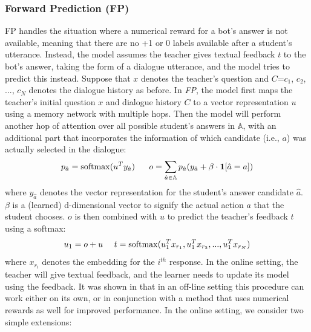 \subsubsection{Forward Prediction (FP)}
FP \citep{weston2016dialog} handles the situation where a numerical reward for a bot's answer is not available, meaning that there are no +1 or 0 labels available after a student's utterance.
Instead, the model assumes
 the teacher gives  textual feedback $t$ to the bot's answer, taking the form of a dialogue utterance,
and the model tries to predict this instead.
Suppose that $x$ denotes the teacher's question and $C$=$c_1$, $c_2$, ..., $c_N$ denotes the dialogue history as before.
In {\it FP}, the model first maps the teacher's initial question $x$ and dialogue history $C$ to
a vector representation $u$ using a memory network with multiple hops.
Then the model will perform another hop of attention over all possible student's answers  in $\mathbb{A}$, 
with an additional part that incorporates the information
of which candidate (i.e., $a$) was actually selected in the dialogue:
\begin{equation}
p_{\hat{a}}=\operatorname{softmax}(u^T y_{\hat{a}})~~~~~o=\sum_{\hat{a}\in \mathbb{A}} p_{\hat{a}} (y_{\hat{a}}+\beta\cdot {\bf 1}[\hat{a}=a] )
\end{equation}
where $y_{\hat{a}}$ denotes the vector representation for the student's  answer candidate $\hat{a}$.
$\beta$ is a (learned) d-dimensional vector to signify the actual action $a$ that the student chooses.
$o$ is then combined with $u$ to predict the teacher's feedback $t$ using a softmax:
\begin{equation}
u_1=o+u ~~~~
t=\operatorname{softmax} (u_1^T x_{r_1}, u_1^T x_{r_2}, ..., u_1^T x_{r_N})
\end{equation}
where $x_{r_{i}}$ denotes the embedding for the $i^{th}$ response.
In the online setting, the teacher will give textual feedback,
and the learner needs to update its model using the feedback.
It was shown in  that in an off-line setting this procedure can work either on its own, or in conjunction with a method that uses numerical rewards as well for improved performance.
In the online setting,  we consider two simple extensions:
